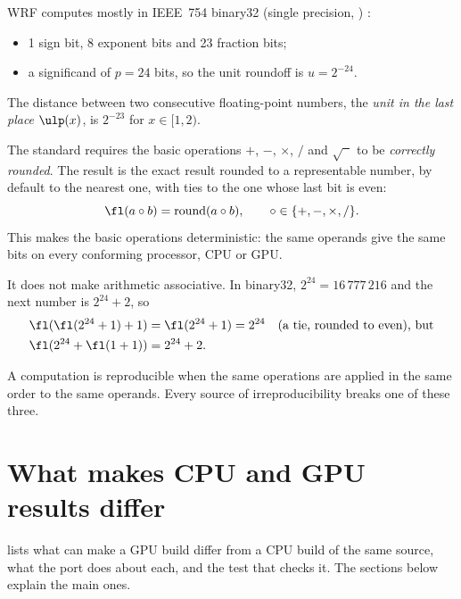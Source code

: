 WRF computes mostly in IEEE~754 binary32 (single precision, ) \citep{ieee754}:
\begin{itemize}
  \item 1 sign bit, 8 exponent bits and 23 fraction bits;
  \item a significand of $p = 24$ bits, so the unit roundoff is $u = 2^{-24}$.
\end{itemize}
The distance between two consecutive floating-point numbers, the \emph{unit in the last place} $\ulp(x)$, is
$2^{-23}$ for $x \in [1,2)$.

The standard requires the basic operations $+$, $-$, $\times$, $/$ and $\sqrt{\phantom{x}}$ to be \emph{correctly
rounded}. The result is the exact result rounded to a representable number, by default to the nearest one, with ties
to the one whose last bit is even:
\begin{equation}
  \fl(a \circ b) = \operatorname{round}(a \circ b), \qquad \circ \in \{+,-,\times,/\}.
\end{equation}
This makes the basic operations deterministic: the same operands give the same bits on every conforming processor,
CPU or GPU.

It does not make arithmetic associative. In binary32, $2^{24} = 16\,777\,216$ and the next number is $2^{24}+2$, so
\begin{align}
  \fl(\fl(2^{24} + 1) + 1) &= \fl(2^{24} + 1) = 2^{24} \quad\text{(a tie, rounded to even), but}\\
  \fl(2^{24} + \fl(1 + 1)) &= 2^{24} + 2.
\end{align}

\begin{keypoint}
A computation is reproducible when the same operations are applied in the same order to the same operands. Every
source of irreproducibility breaks one of these three.
\end{keypoint}

\section{What makes CPU and GPU results differ}

 lists what can make a GPU build differ from a CPU build of the same source, what the port
does about each, and the test that checks it. The sections below explain the main ones.

